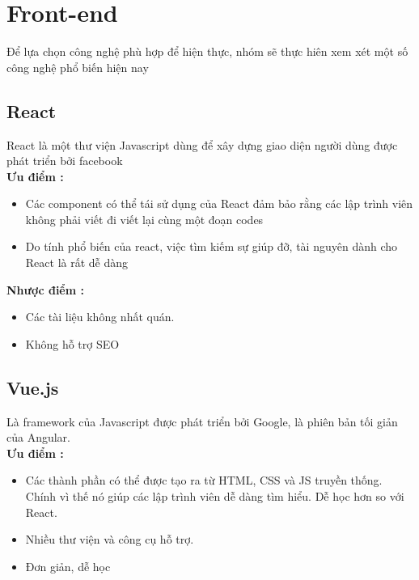 
\section{Front-end}
Để lựa chọn công nghệ phù hợp để hiện thực, nhóm sẽ thực hiên xem xét một số công nghệ phổ biến hiện nay

\subsection{React}
\hspace*{0.5cm} React là một thư viện Javascript dùng để xây dựng giao diện người dùng được phát triển bởi facebook\\

\textbf{Ưu điểm \cite{technologyFE}:}
\begin{itemize}
    \item Các component có thể tái sử dụng của React đảm bảo rằng các lập trình viên không phải viết đi viết lại cùng một đoạn codes
    \item Do tính phổ biến của react, việc tìm kiếm sự giúp đỡ, tài nguyên dành cho React là rất dễ dàng
\end{itemize}

\textbf{Nhược điểm \cite{technologyFE}:}
\begin{itemize}
    \item Các tài liệu không nhất quán.
    \item Không hỗ trợ SEO
\end{itemize}

\subsection{Vue.js}

\hspace*{0.5cm} Là framework của Javascript được phát triển bởi Google, là phiên bản tối giản của Angular.    \\


\textbf{Ưu điểm \cite{technologyFE}:}
\begin{itemize}
    \item Các thành phần có thể được tạo ra từ HTML, CSS và JS truyền thống. Chính vì thế nó giúp các lập trình viên dễ dàng tìm hiểu. Dễ học hơn so với React.
    \item Nhiều thư viện và công cụ hỗ trợ.
    \item Đơn giản, dễ học
\end{itemize}

